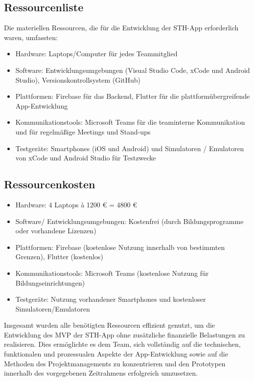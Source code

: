 \subsection{Ressourcenliste}
Die materiellen Ressourcen, die für die Entwicklung der STH-App erforderlich waren, umfassten:
\begin{itemize}
    \item Hardware: Laptops/Computer für jedes Teammitglied
    \item Software: Entwicklungsumgebungen (Visual Studio Code, xCode und Android Studio), Versionskontrollsystem (GitHub)
    \item Plattformen: Firebase für das Backend, Flutter für die plattformübergreifende App-Entwicklung
    \item Kommunikationstools: Microsoft Teams für die teaminterne Kommunikation und für regelmäßige Meetings und Stand-ups
    \item Testgeräte: Smartphones (iOS und Android) und Simulatoren / Emulatoren von xCode und Android Studio für Testzwecke
\end{itemize}

\subsection{Ressourcenkosten}

\begin{itemize}
    \item Hardware: 4 Laptops à 1200 € = 4800 €
    \item Software/ Entwicklungsumgebungen: Kostenfrei (durch Bildungsprogramme oder vorhandene Lizenzen)
    \item Plattformen: Firebase (kostenlose Nutzung innerhalb von bestimmten Grenzen), Flutter (kostenlos)
    \item Kommunikationstools: Microsoft Teams (kostenlose Nutzung für Bildungseinrichtungen)
    \item Testgeräte: Nutzung vorhandener Smartphones und kostenloser Simulatoren/Emulatoren
\end{itemize}

\noindent
Insgesamt wurden alle benötigten Ressourcen effizient genutzt, um die Entwicklung des MVP der STH-App ohne zusätzliche finanzielle Belastungen zu realisieren.
Dies ermöglichte es dem Team, sich vollständig auf die technischen, funktionalen und prozessualen Aspekte der App-Entwicklung sowie auf die Methoden des Projektmanagements zu konzentrieren und den Prototypen innerhalb des vorgegebenen Zeitrahmens erfolgreich umzusetzen.
